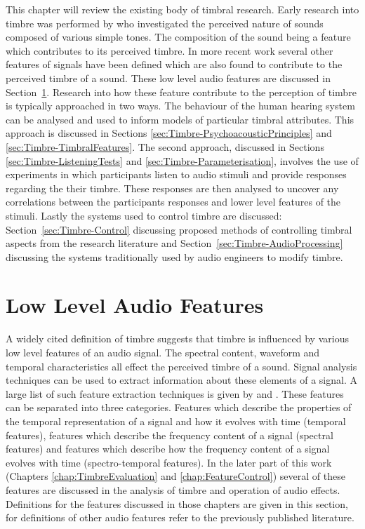 	This chapter will review the existing body of timbral research. Early research into timbre was performed by
	\citet{helmholtz1875on} who investigated the perceived nature of sounds composed of various simple tones. The
	composition of the sound being a feature which contributes to its perceived timbre. In more recent work several
	other features of signals have been defined which are also found to contribute to the perceived timbre of a sound.
	These low level audio features are discussed in Section~\ref{sec:Timbre-LowLevelFeatures}. Research into how these
	feature contribute to the perception of timbre is typically approached in two ways. The behaviour of the human
	hearing system can be analysed and used to inform models of particular timbral attributes. This approach is
	discussed in Sections \ref{sec:Timbre-PsychoacousticPrinciples} and \ref{sec:Timbre-TimbralFeatures}. The second
	approach, discussed in Sections \ref{sec:Timbre-ListeningTests} and \ref{sec:Timbre-Parameterisation}, involves the
	use of experiments in which participants listen to audio stimuli and provide responses regarding the their timbre.
	These responses are then analysed to uncover any correlations between the participants responses and lower level
	features of the stimuli. Lastly the systems used to control timbre are discussed: Section~\ref{sec:Timbre-Control}
	discussing proposed methods of controlling timbral aspects from the research literature and
	Section~\ref{sec:Timbre-AudioProcessing} discussing the systems traditionally used by audio engineers to modify
	timbre.

\section{Low Level Audio Features}
\label{sec:Timbre-LowLevelFeatures}
	A widely cited definition of timbre \citep{ASA1960american} suggests that timbre is influenced by various low level
	features of an audio signal. The spectral content, waveform and temporal characteristics all effect the perceived
	timbre of a sound. Signal analysis techniques can be used to extract information about these elements of a signal.
	A large list of such feature extraction techniques is given by \citet{peeters2004a} and
	\citet{bullock2008implementing}. These features can be separated into three categories. Features which describe the
	properties of the temporal representation of a signal and how it evolves with time (temporal
	features), features which describe the frequency content of a signal (spectral features) and features which
	describe how the frequency content of a signal evolves with time (spectro-temporal features). In the later part of
	this work (Chapters \ref{chap:TimbreEvaluation} and \ref{chap:FeatureControl}) several of these features are
	discussed in the analysis of timbre and operation of audio effects. Definitions for the features discussed in those
	chapters are given in this section, for definitions of other audio features refer to the previously published
	literature.

